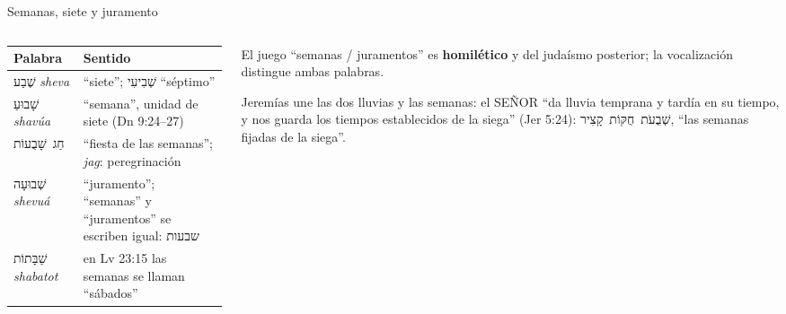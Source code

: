 \documentclass[hyperref={bookmarks=false},aspectratio=169]{beamer}
\newcommand{\heb}[1]{\mbox{\foreignlanguage{hebrew}{#1}}}
\newcommand{\SENOR}{S{\fontsize{0.78em}{1em}\selectfont EÑOR}}
\newcommand{\destacar}[1]{\textbf{\textcolor{tierraroja}{#1}}}
\begin{document}
\begin{frame}{Semanas, siete y juramento}
\begin{columns}[t,onlytextwidth]
\begin{column}{0.55\textwidth}
\scriptsize\renewcommand{\arraystretch}{1.12}
\begin{tabular}{@{}L{2.2cm}L{4.4cm}@{}}
\toprule
\textbf{Palabra} & \textbf{Sentido} \\ \midrule
\heb{שֶׁבַע} \emph{sheva} & ``siete''; \heb{שְׁבִיעִי} ``séptimo'' \\
\heb{שָׁבוּעַ} \emph{shavúa} & ``semana'', unidad de siete (Dn 9:24--27) \\
\heb{חַג שָׁבֻעוֹת} & ``fiesta de las semanas''; \emph{jag}: peregrinación \\
\heb{שְׁבוּעָה} \emph{shevuá} & ``juramento''; ``semanas'' y ``juramentos'' se escriben igual: \heb{שבעות} \\
\heb{שַׁבָּתוֹת} \emph{shabatot} & en Lv 23:15 las semanas se llaman ``sábados'' \\
\bottomrule
\end{tabular}
\end{column}
\begin{column}{0.43\textwidth}\small\RaggedRight
El juego ``semanas / juramentos'' es \destacar{homilético} y del judaísmo posterior; la vocalización distingue ambas palabras.\par\medskip
Jeremías une las dos lluvias y las semanas: el \SENOR{} ``da lluvia temprana y tardía en su tiempo, y nos guarda los tiempos establecidos de la siega'' (Jer 5:24): \heb{שְׁבֻעֹת חֻקּוֹת קָצִיר}, ``las semanas fijadas de la siega''.
\end{column}
\end{columns}
\end{frame}
\end{document}
